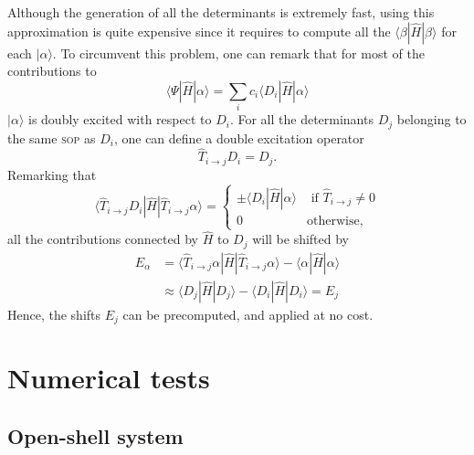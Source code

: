 \documentclass[aip,jcp,reprint,showkeys]{revtex4-1}
\newcommand{\ket}[1]{|#1\rangle}
\newcommand{\sop}{\textsc{sop}}
\newcommand{\mel}[3]{\langle #1 | #2 | #3 \rangle}
\begin{document}
Although the generation of all the determinants is extremely fast, using
this approximation is quite expensive since it requires to compute
all the $\mel{\beta}{\hat{H}}{\beta}$ for each $\ket{\alpha}$.
To circumvent this problem, one can remark that for most of the contributions to
\begin{equation}
 \langle \Psi | \hat{H} | \alpha \rangle = \sum_i c_i \langle D_i | \hat{H} | \alpha \rangle
\end{equation}
$\ket{\alpha}$ is doubly excited with respect to $D_i$.
For all the determinants $D_j$ belonging to the same \sop{} as $D_i$, one can
define a double excitation operator
\begin{equation}
\hat{T}_{i\rightarrow j} D_i = D_j.
\end{equation}
Remarking that
\begin{equation}
\langle \hat{T}_{i\rightarrow j} D_i | \hat{H} | \hat{T}_{i\rightarrow j} \alpha \rangle =
\begin{cases}
\pm \langle D_i | \hat{H} | \alpha \rangle & \text{ if } \hat{T}_{i\rightarrow j} \ne 0 \\
0 & \text{otherwise},
\end{cases}
\end{equation}
all the contributions connected by $\hat{H}$ to $D_j$ will be shifted by 
\begin{align}
E_\alpha & = \langle \hat{T}_{i\rightarrow j} \alpha | \hat{H} | \hat{T}_{i\rightarrow j} \alpha \rangle - \langle \alpha | \hat{H} | \alpha \rangle \\
         & \approx \langle D_j | \hat{H} | D_j \rangle - \langle D_i | \hat{H} | D_i \rangle  = E_j
\end{align}
Hence, the shifts $E_j$ can be precomputed, and applied at no cost.




\section{Numerical tests}


\subsection{Open-shell system}
\end{document}
